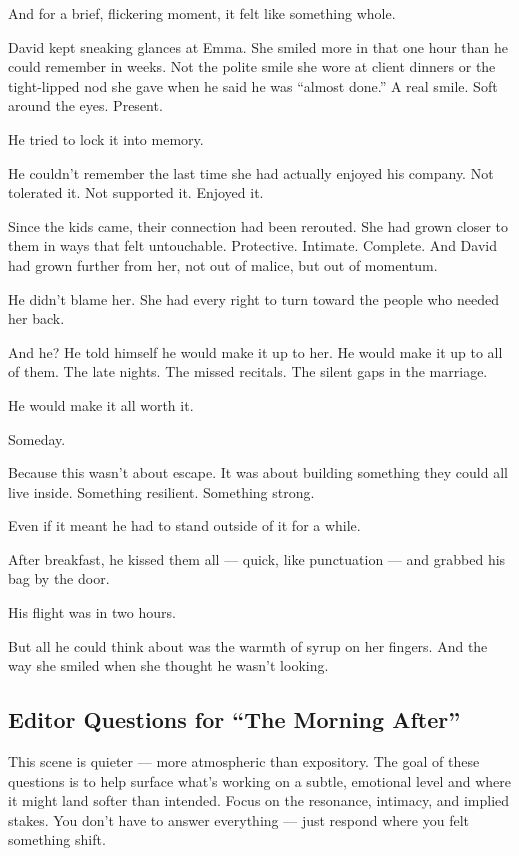 And for a brief, flickering moment, it felt like something whole.

David kept sneaking glances at Emma. She smiled more in that one hour than he could remember in weeks. Not the 
polite smile she wore at client dinners or the tight-lipped nod she gave when he said he was “almost done.” 
A real smile. Soft around the eyes. Present.

He tried to lock it into memory.

He couldn’t remember the last time she had actually enjoyed his company. Not tolerated it. Not supported it. 
Enjoyed it.

Since the kids came, their connection had been rerouted. She had grown closer to them in ways that felt 
untouchable. Protective. Intimate. Complete. And David had grown further from her, not out of malice, 
but out of momentum.

He didn’t blame her. She had every right to turn toward the people who needed her back.

And he? He told himself he would make it up to her. He would make it up to all of them.
The late nights. The missed recitals. The silent gaps in the marriage.

He would make it all worth it.

Someday.

Because this wasn’t about escape. It was about building something they could all live inside.
Something resilient. Something strong.

Even if it meant he had to stand outside of it for a while.

After breakfast, he kissed them all --- quick, like punctuation --- and grabbed his bag by the door.

His flight was in two hours.

But all he could think about was the warmth of syrup on her fingers.
And the way she smiled when she thought he wasn’t looking.


\subsection*{Editor Questions for ``The Morning After''}

This scene is quieter — more atmospheric than expository. The goal of these questions is to help surface what’s working on a subtle, emotional level and where it might land softer than intended. Focus on the resonance, intimacy, and implied stakes. You don’t have to answer everything — just respond where you felt something shift.

